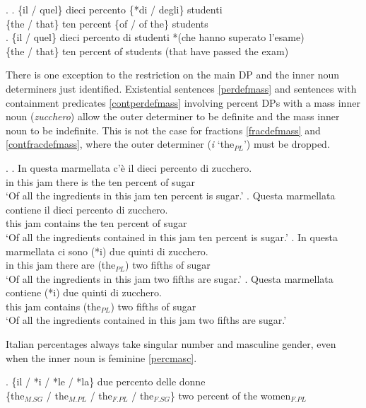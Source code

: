 \documentclass[charis, linguex]{glossa}
\begin{document}
\ex. \ag. \{il / quel\} dieci percento \{*di / degli\} studenti \\
      \{the / that\} ten percent \{of / {of the}\} students \\ \label{percentdef}
\bg. \{il / quel\} dieci percento di studenti *(che hanno superato l'esame) \\
      \{the / that\} ten percent of students (that have passed {the exam}) \\ \label{percentindef}
	  

There is one exception to the restriction on the main DP and the inner noun determiners just identified. Existential sentences \ref{perdefmass} and sentences with containment predicates \ref{contperdefmass} involving percent DPs with a mass inner noun (\textit{zucchero}) allow the outer determiner to be definite and the mass inner noun to be indefinite. This is not the case for fractions \ref{fracdefmass} and \ref{contfracdefmass}, where the outer determiner (\textit{i} `the$_{PL}$') must be dropped. 

	\ex. \ag. In questa marmellata c'\`{e} il dieci percento di zucchero. \\ 
	      in this jam {there is} the ten percent of sugar \\ 
		  \glt `Of all the ingredients in this jam ten percent is sugar.' \label{perdefmass}
		  \bg. Questa marmellata contiene il dieci percento di zucchero. \\ 
		  	      this jam contains the ten percent of sugar \\ 
		  		  \glt `Of all the ingredients contained in this jam ten percent is sugar.' \label{contperdefmass}
		  \cg. In questa marmellata ci sono (*i) due quinti di zucchero. \\ 
	      in this jam there are (the$_{PL}$) two fifths of sugar \\ 
		 \glt `Of all the ingredients in this jam two fifths are sugar.' \label{fracdefmass}	 
	\dg. Questa marmellata contiene (*i) due quinti di zucchero. \\ 
	      this jam contains (the$_{PL}$) two fifths of sugar \\ 
		 \glt `Of all the ingredients contained in this jam two fifths are sugar.' \label{contfracdefmass}
	  
	  
Italian percentages always take singular number and masculine gender, even when the inner noun is feminine \ref{percmasc}.

\exg.  \{il / *i / *le / *la\} due percento delle donne \\
	    \{the$_{M.SG}$ / the$_{M.PL}$ / the$_{F.PL}$ / the$_{F.SG}$\} two percent {of the} women$_{F.PL}$\\ \label{percmasc} 	
\end{document}

